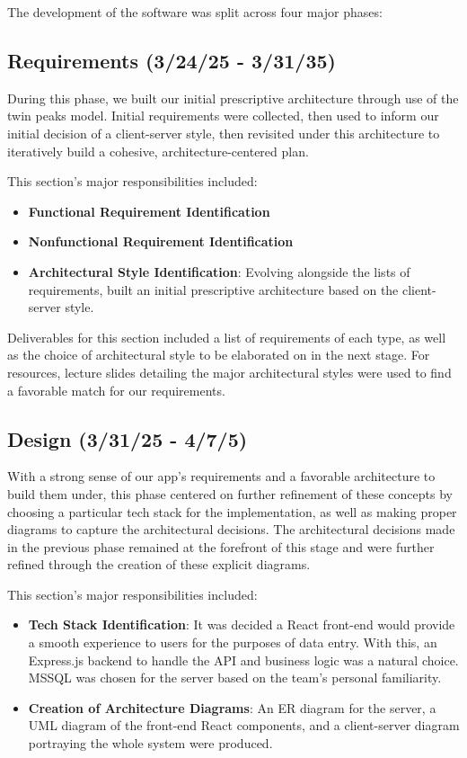 The development of the software was split across four major phases:

\subsection{Requirements (3/24/25 - 3/31/35)}

During this phase, we built our initial prescriptive architecture through use of the twin peaks model. Initial requirements were collected, then used to inform our initial decision of a client-server style, then revisited under this architecture to iteratively build a cohesive, architecture-centered plan.

This section's major responsibilities included:
\begin{itemize}
    \item \textbf{Functional Requirement Identification}
    \item \textbf{Nonfunctional Requirement Identification}
    \item \textbf{Architectural Style Identification}: Evolving alongside the lists of requirements, built an initial prescriptive architecture based on the client-server style.
\end{itemize}

Deliverables for this section included a list of requirements of each type, as well as the choice of architectural style to be elaborated on in the next stage. For resources, lecture slides detailing the major architectural styles were used to find a favorable match for our requirements.

\subsection{Design (3/31/25 - 4/7/5)}

With a strong sense of our app's requirements and a favorable architecture to build them under, this phase centered on further refinement of these concepts by choosing a particular tech stack for the implementation, as well as making proper diagrams to capture the architectural decisions. The architectural decisions made in the previous phase remained at the forefront of this stage and were further refined through the creation of these explicit diagrams.

This section's major responsibilities included:
\begin{itemize}
    \item \textbf{Tech Stack Identification}: It was decided a React front-end would provide a smooth experience to users for the purposes of data entry. With this, an Express.js backend to handle the API and business logic was a natural choice. MSSQL was chosen for the server based on the team's personal familiarity.
    \item \textbf{Creation of Architecture Diagrams}: An ER diagram for the server, a UML diagram of the front-end React components, and a client-server diagram portraying the whole system were produced.
\end{itemize}

